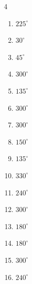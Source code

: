 \begin{multicols}{4}
\begin{enumerate}
  \item $\displaystyle 225^{\circ}$

  \item $\displaystyle 30^{\circ}$

  \item $\displaystyle 45^{\circ}$

  \item $\displaystyle 300^{\circ}$

  \item $\displaystyle 135^{\circ}$

  \item $\displaystyle 300^{\circ}$

  \item $\displaystyle 300^{\circ}$

  \item $\displaystyle 150^{\circ}$

  \item $\displaystyle 135^{\circ}$

  \item $\displaystyle 330^{\circ}$

\columnbreak %

\resetques

  \item $\displaystyle 240^{\circ}$

  \item $\displaystyle 300^{\circ}$

  \item $\displaystyle 180^{\circ}$
        \phantom{$\displaystyle =\pi$}

  \item $\displaystyle 180^{\circ}$
        \phantom{$\displaystyle =\pi$}

  \item $\displaystyle 300^{\circ}$

  \item $\displaystyle 240^{\circ}$


\end{enumerate}
\end{multicols}
